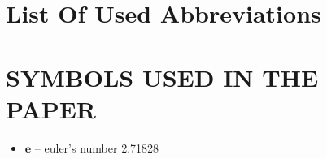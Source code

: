 
\tableofcontents
\newpage

\section*{\centering List Of Used Abbreviations}
\begin{adjustwidth}{113pt}{43pt}
	\begin{sortedlist}
	\end{sortedlist}
\end{adjustwidth}
\newpage{}
\section*{SYMBOLS USED IN THE PAPER}
\begin{center}
	\begin{minipage}[c]{0.5\linewidth}
		\begin{itemize}[label={}]
			\item $ \mathbf{e} $ -- euler's number 2.71828
		\end{itemize}
	\end{minipage}
\end{center}
